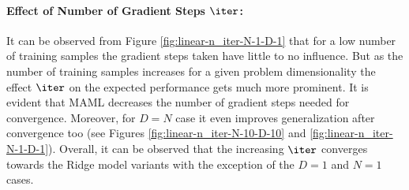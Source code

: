 \paragraph{Effect of Number of Gradient Steps $\iter$:} It can be observed from Figure \ref{fig:linear-n_iter-N-1-D-1} that for a low number of training samples the gradient steps taken have little to no influence. But as the number of training samples increases for a given problem dimensionality the effect $\iter$ on the expected performance gets much more prominent. It is evident that MAML decreases the number of gradient steps needed for convergence. Moreover, for $D=N$ case it even improves generalization after convergence too (see Figures \ref{fig:linear-n_iter-N-10-D-10} and \ref{fig:linear-n_iter-N-1-D-1}). Overall, it can be observed that the increasing $\iter$ converges towards the Ridge model variants with the exception of the $D=1$ and $N=1$ cases.
 
